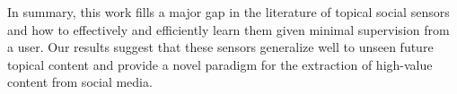 In summary, this work fills a major gap in the literature of topical
social sensors and how to effectively and efficiently learn them given
minimal supervision from a user.  Our results suggest that these
sensors generalize well to unseen future topical content and provide a
novel paradigm for the extraction of high-value content from social
media.


%
%
